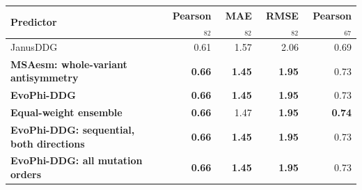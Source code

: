 \begin{tabular}{lrrrr}\toprule Predictor & Pearson$_{82}$ & MAE$_{82}$ & RMSE$_{82}$ & Pearson$_{67}$\\\midrule
JanusDDG & 0.61 & 1.57 & 2.06 & 0.69 \\
\textbf{MSAesm: whole-variant antisymmetry} & \textbf{0.66} & \textbf{1.45} & \textbf{1.95} & 0.73 \\
\textbf{EvoPhi-DDG} & \textbf{0.66} & \textbf{1.45} & \textbf{1.95} & 0.73 \\
\textbf{Equal-weight ensemble} & \textbf{0.66} & 1.47 & \textbf{1.95} & \textbf{0.74} \\
\textbf{EvoPhi-DDG: sequential, both directions} & \textbf{0.66} & \textbf{1.45} & \textbf{1.95} & 0.73 \\
\textbf{EvoPhi-DDG: all mutation orders} & \textbf{0.66} & \textbf{1.45} & \textbf{1.95} & 0.73 \\
\bottomrule\end{tabular}
